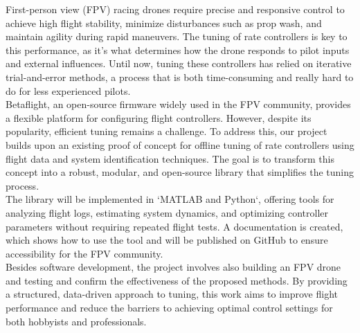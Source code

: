 \documentclass{article}
\begin{document}
First-person view (FPV) racing drones require precise and responsive control to achieve high flight stability, minimize disturbances such as prop wash, and maintain agility during rapid maneuvers. The tuning of rate controllers is key to this performance, as it's what determines how the drone responds to pilot inputs and external influences. Until now, tuning these controllers has relied on iterative trial-and-error methods, a process that is both time-consuming and really hard to do for less experienced pilots. \\
Betaflight, an open-source firmware widely used in the FPV community, provides a flexible platform for configuring flight controllers. However, despite its popularity, efficient tuning remains a challenge. To address this, our project builds upon an existing proof of concept for offline tuning of rate controllers using flight data and system identification techniques. The goal is to transform this concept into a robust, modular, and open-source library that simplifies the tuning process.\\
The library will be implemented in `MATLAB and Python`, offering tools for analyzing flight logs, estimating system dynamics, and optimizing controller parameters without requiring repeated flight tests. A documentation is created, which shows how to use the tool and will be published on GitHub to ensure accessibility for the FPV community.\\
Besides software development, the project involves also building an FPV drone and testing and confirm the effectiveness of the proposed methods. By providing a structured, data-driven approach to tuning, this work aims to improve flight performance and reduce the barriers to achieving optimal control settings for both hobbyists and professionals.
\end{document}
